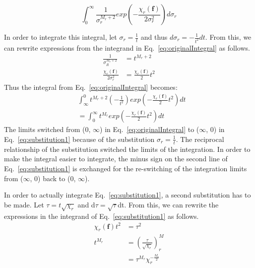 \documentclass[11pt]{article}
\begin{document}
\begin{equation} \label{eq:originalIntegral}
\int_{0}^{\infty} \frac{1}{\sigma_r^{M_r + 2}} exp \left( -\frac{\chi_r(\mathbf{f})}{2\sigma_r^2} \right)d\sigma_r
\end{equation}
 
 In order to integrate this integral, let $\sigma_r = \frac{1}{t}$ and thus $d\sigma_r = -\frac{1}{t^2}dt$. From this, we can rewrite expressions from the integrand in Eq.~\ref{eq:originalIntegral} as follows.
  \begin{equation}
 \begin{split}
 \frac{1}{\sigma_R^{M_r + 2} } & = t^{M_r + 2} \\
 \frac{\chi_r(\mathbf{f})}{2\sigma_r^2} & = \frac{\chi_r(\mathbf{f})}{2} t^2
 \end{split}
 \end{equation}
 Thus the integral from Eq.~\ref{eq:originalIntegral} becomes:
 \begin{equation} \label{eq:substitution1}
 \begin{split}
&  \int_{\infty}^{0} t^{M_r + 2} \left( -\frac{1}{t^2} \right)exp \left( -\frac{\chi_r(\mathbf{f})}{2} t^2 \right) dt \\
& =  \int_{0}^{\infty} t^{M_r}exp\left( -\frac{\chi_r(\mathbf{f})}{2} t^2 \right) dt
 \end{split}
 \end{equation}
 The limits switched from (0, $\infty$) in Eq.~\ref{eq:originalIntegral} to ($\infty$, 0) in Eq.~\ref{eq:substitution1} because of the substitution $\sigma_r = \frac{1}{t}$. The reciprocal relationship of the substitution switched the limits of the integration. In order to make the integral easier to integrate, the minus sign on the second line of Eq.~\ref{eq:substitution1} is exchanged for the re-switching of the integration limits from ($\infty$, 0) back to (0, $\infty$). 
 
 In order to actually integrate Eq.~\ref{eq:substitution1}, a second substitution has to be made. Let $\tau = t\sqrt{\chi_r}$ and d$\tau = \sqrt{\tau}$dt. From this, we can rewrite the expressions in the integrand of Eq.~\ref{eq:substitution1} as follows. 
 \begin{equation}
 \begin{split}
 \chi_r(\mathbf{f}) t^2 & = \tau^2 \\
 t^{M_r} & = {\left( \frac{\tau}{\sqrt{\chi_r}} \right)}^M_r \\
 & = \tau^{M_r}\chi_r^{-\frac{M_r}{2}} 
 \end{split}
 \end{equation}
 
\end{document}
